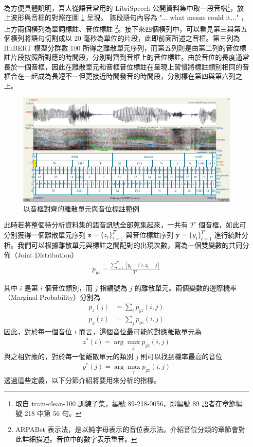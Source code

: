         為方便具體說明，吾人從語音常用的 LibriSpeech \cite{panayotov_librispeech_2015} 公開資料集中取一段音檔\footnote{取自 train-clean-100 訓練子集，編號 89-218-0056，即編號 89 語者在章節編號 218 中第 56 句。}，放上波形與音框的對照在圖 \ref{fig:enter-labelwav} 呈現。 該段語句內容為 "... what means could it..." ，上方兩個橫列為單詞標註、音位標註 \footnote{ARPABet 表示法，是以純字母表示的音位表示法。介紹音位分類的章節會對此詳細描述。音位中的數字表示重音。}。接下來四個橫列中，可以看見第三與第五個橫列將語句切割成以 20 毫秒為單位的片段，此即前面所述之音框。第三列為 HuBERT 模型分群數 100 所得之離散單元序列，而第五列則是由第二列的音位標註片段按照所對應的時間段，分別對齊到音框上的音位標註。由於音位的長度通常長於一個音框，因此在離散單元和音框音位標註在呈現上習慣將標註類別相同的音框合在一起成為長短不一但更接近時間發音的時間段，分別標在第四與第六列之上。
        \begin{figure}
            \centering
            \includegraphics[width=1\linewidth]{figures/praat.png}
            \caption{以音框對齊的離散單元與音位標註範例}
            \label{fig:enter-labelwav}
        \end{figure}
        
        此時若將整個待分析資料集的語音訊號全部蒐集起來，一共有 $T'$ 個音框，如此可分別獲得一個離散單元序列 $\boldsymbol{z} = \{z_t\}_{t=1}^{T'}$ 與音位標註序列 $\boldsymbol{y} = \{y_t\}_{t=1}^{T'}$ 進行統計分析。我們可以根據離散單元與標註之間配對的出現次數，寫為一個雙變數的共同分佈（Joint Distribution）
\begin{align}
    p_{yz} = \frac{\sum^{T'}_{t=1}[{y_t = i \wedge z_t = j}]}{T'}
\end{align}

其中 $i$ 是第 $i$ 個音位類別，而 $j$ 指編號為 $j$ 的離散單元。兩個變數的邊際機率（Marginal Probability）分別為
\begin{align}
    p_z(j) & =\sum_i{p_{yz}(i, j)} \\
    p_y(i) & =\sum_j{p_{yz}(i, j)}
\end{align}
因此，對於每一個音位 $i$ 而言，這個音位最可能的對應離散單元為
\begin{align}
    z^\ast(i) = \arg\max_j p_{yz}(i, j)
\end{align}
與之相對應的，對於每一個離散單元的類別 $j$ 則可以找到機率最高的音位
\begin{align}
    y^\ast(j) = \arg\max_i p_{yz}(i,j)
\end{align}
透過這些定義，以下分節介紹將要用來分析的指標。

